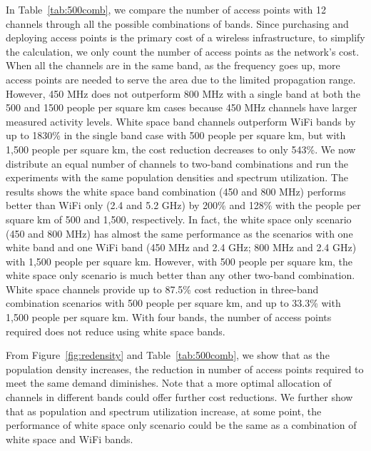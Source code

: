 In Table~\ref{tab:500comb}, we compare the number of access points with 12 channels through all 
the possible combinations of bands. 
Since purchasing and deploying access points is the primary cost of a wireless 
infrastructure, to simplify the calculation, we only count the number of access points as 
the network's cost. 
When all the channels are in the same band, as the frequency goes up, more access 
points are needed to serve the area due to the limited propagation range. However,
450 MHz does not outperform 800 MHz with a single band at both the 500 and 1500 people per
square km cases because 450 MHz channels have larger measured activity levels. 
White space band channels outperform WiFi bands by up to 1830\% in the single band case
with 500 people per square km, but with 1,500 people per square km, the cost reduction
decreases to only 543\%.
We now distribute an equal number of channels to two-band combinations and run the experiments 
with the same population densities and spectrum utilization. The results shows the white space band
combination (450 and 800 MHz) performs better than WiFi only (2.4 and 5.2 GHz) by 200\% and
128\% with the people per square km of 500 and 1,500, respectively. In fact, the white space only
scenario (450 and 800 MHz) has almost the same performance as the scenarios with one white band and
one WiFi band (450 MHz and 2.4 GHz; 800 MHz and 2.4 GHz) with 1,500 people per square km.
However, with 500 people per square km, the white space only scenario is much better than any other two-band combination.
White space channels provide up to 87.5\% cost reduction in three-band combination scenarios with
500 people per square km, and up to 33.3\% with 1,500 people per square km.  With four bands,
the number of access points required does not reduce using white space bands.

From Figure~\ref{fig:redensity} and Table~\ref{tab:500comb}, we show that as the population
density increases, the reduction in number of access points required to meet the same demand 
diminishes. Note that a more optimal allocation of channels in different bands could offer
further cost reductions. We further show that as population and spectrum utilization increase, 
at some point, the performance of white space only scenario could be the same as a combination of
white space and WiFi bands. 

